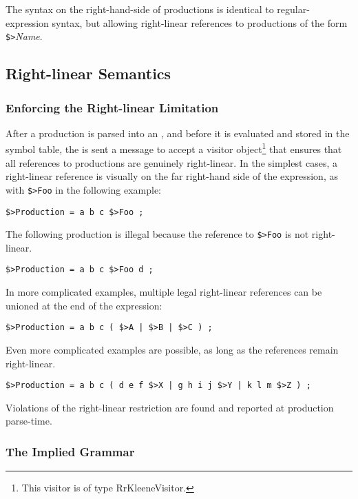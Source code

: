 \noindent
The syntax on the right-hand-side of productions is identical to regular-expression syntax, but allowing right-linear references to productions of the form
\verb!$>!\emph{Name}.

\subsection{Right-linear Semantics}


\subsubsection{Enforcing the Right-linear Limitation}

After a production is parsed into an
, and before it is evaluated and stored in the symbol table, the
 is sent a message to accept a visitor object\footnote{This
visitor is of type
RrKleeneVisitor.} that ensures that
all references to productions are genuinely right-linear.  In the simplest cases,
a right-linear reference is visually on the far right-hand side of the
expression, as with \verb!$>Foo! in the following example:

\begin{Verbatim}
$>Production = a b c $>Foo ;
\end{Verbatim}

\noindent
The following production is illegal because the reference to \verb!$>Foo! is not right-linear.

\begin{Verbatim}
$>Production = a b c $>Foo d ;
\end{Verbatim}


\noindent
In more complicated examples, multiple legal right-linear references can be unioned 
at the end of the expression:

\begin{Verbatim}
$>Production = a b c ( $>A | $>B | $>C ) ;
\end{Verbatim}

\noindent
Even more complicated examples are possible, as long as the references remain
right-linear. 

\begin{Verbatim}
$>Production = a b c ( d e f $>X | g h i j $>Y | k l m $>Z ) ;
\end{Verbatim}

\noindent
Violations of the right-linear restriction are found and reported
at production parse-time.

\subsubsection{The Implied Grammar}

